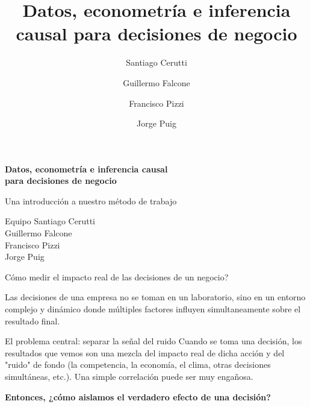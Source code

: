 \documentclass[aspectratio=169]{beamer}
\title{Datos, econometría e inferencia causal para decisiones de negocio}
\author{
Santiago Cerutti \and Guillermo Falcone \and Francisco Pizzi \and Jorge Puig
}
\date{}
\newcommand{\highlight}[1]{\textcolor{YPFBlue}{\textbf{#1}}}
\newcommand{\soft}[1]{\textcolor{SoftGray}{#1}}
\begin{document}
\begin{frame}[plain]
    \centering
    \vspace{1cm}
    
    {\color{YPFBlue}\bfseries\LARGE Datos, econometría e inferencia causal\\[0.2cm]
    para decisiones de negocio}

    \vspace{0.7cm}

    {\large \soft{Una introducción a nuestro método de trabajo}}

    \vfill

    \begin{block}{\large Equipo}
        \large
        \quad\textbullet\quad Santiago Cerutti \\ \quad\textbullet\quad Guillermo Falcone \\ \quad\textbullet\quad Francisco Pizzi \\ \quad\textbullet\quad Jorge Puig
    \end{block}
    
    \vfill
\end{frame}

\begin{frame}{Cómo medir el impacto real de las decisiones de un negocio?}

\vspace{0.5cm}

\begin{center}
\Large
Las decisiones de una empresa no se toman en un laboratorio, sino en un \soft{entorno complejo y dinámico donde múltiples factores influyen simultaneamente sobre el resultado final.}
\end{center}

\vspace{1cm}

\begin{block}{El problema central: separar la señal del ruido}
\justifying
Cuando se toma una decisión, los resultados que vemos son una mezcla del impacto real de dicha acción y del "ruido" de fondo (la competencia, la economía, el clima, otras decisiones simultáneas, etc.). Una simple correlación puede ser muy engañosa.
\vspace{0.3cm}
\begin{center}
\Large\highlight{Entonces, ¿cómo aislamos el verdadero efecto de una decisión?}
\end{center}
\end{block}

\vfill

\end{frame}
\end{document}

